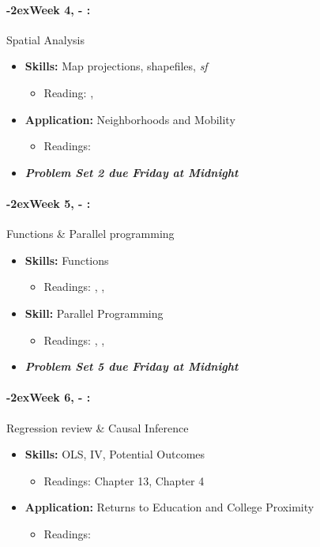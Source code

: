 \documentclass[11pt]{article}
\newcommand{\week}[1]{%
  \paragraph*{\kern-2ex\quad #1, \AdvanceDate[1]\syldate{\today} - \AdvanceDate[2]\syldate{\today}:}%
  \ifdim\wd1=\wd\MONDAY
    \AdvanceDate[7]
  \else
    \AdvanceDate[7]
  \fi%
}
\begin{document}
\week{Week 4} Spatial Analysis
\begin{itemize}
  \item \textbf{Skills:} Map projections, shapefiles, \textit{sf}
  \begin{itemize}
    \item Reading: \textbf{\cite{mcdermott2023spatial}} \cite{crs}, \cite{lovelace2019geographic}
  \end{itemize}
  \item \textbf{Application:} Neighborhoods and Mobility
  \begin{itemize}
    \item Readings: \textbf{\cite{chetty2018opportunityatlas}}
  \end{itemize}
  \item \textit{\textbf{Problem Set 2 due Friday at Midnight}}
\end{itemize}
\week{Week 5} Functions \& Parallel programming
\begin{itemize}
  \item \textbf{Skills:} Functions
  \begin{itemize}
    \item Readings: \cite{mcdermott2023functionsintro}, \cite{mcdermott2023functionsadvanced} \cite{wickham2023meta}, \cite{tidyeval}
  \end{itemize}
  \item \textbf{Skill:} Parallel Programming
  \begin{itemize}
    \item Readings: \textbf{\cite{mcdermott2023parallel}}, \cite{eddelbuettel2020parallel}, \cite{mcdermott2023parallel}
  \end{itemize}
  \item \textit{\textbf{Problem Set 5 due Friday at Midnight}}
\end{itemize}
\week{Week 6} Regression review \& Causal Inference
\begin{itemize}
  \item \textbf{Skills:} OLS, IV, Potential Outcomes
  \begin{itemize}
    \item Readings: \cite{hungtintonklein2023effect} Chapter 13, \cite{cunningham2023mixtape} Chapter 4
  \end{itemize}
  \item \textbf{Application:} Returns to Education and College Proximity
  \begin{itemize}
    \item Readings: \textbf{\cite{card1993college}}
  \end{itemize}
\end{itemize}
\end{document}
